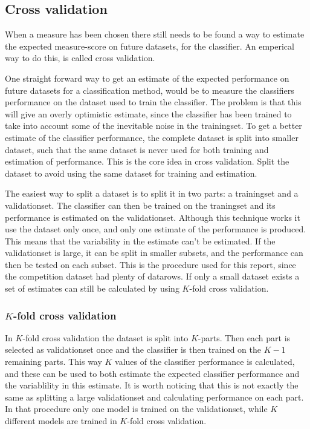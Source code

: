 \subsection{Cross validation}
When a measure has been chosen there still needs to be found a way to estimate the expected measure-score on future datasets, for the classifier. An emperical way to do this, is called cross validation. \par
One straight forward way to get an estimate of the expected performance on future datasets for a classification method, would be to measure the classifiers performance on the dataset used to train the classifier. The problem is that this will give an overly optimistic estimate, since the classifier has been trained to take into account some of the inevitable noise in the trainingset. To get a better estimate of the classifier performance, the complete dataset is split into smaller dataset, such that the same dataset is never used for both training and estimation of performance. This is the core idea in cross validation. Split the dataset to avoid using the same dataset for training and estimation. \par
The easiest way to split a dataset is to split it in two parts: a trainingset and a validationset. The classifier can then be trained on the traningset and its performance is estimated on the validationset. Although this technique works it use the dataset only once, and only one estimate of the performance is produced. This means that the variability in the estimate can't be estimated. If the validationset is large, it can be split in smaller subsets, and the performance can then be tested on each subset. This is the procedure used for this report, since the competition dataset had plenty of datarows. If only a small dataset exists a set of estimates can still be calculated by using $K$-fold cross validation. 

\subsubsection{$K$-fold cross validation}
In $K$-fold cross validation the dataset is split into $K$-parts. Then each part is selected as validationset once and the classifier is then trained on the $K-1$ remaining parts. This way $K$ values of the classifier performance is calculated, and these can be used to both estimate the expected classifier performance and the variablility in this estimate. It is worth noticing that this is not exactly the same as splitting a large validationset and calculating performance on each part. In that procedure only one model is trained on the validationset, while $K$ different models are trained in $K$-fold cross validation.

